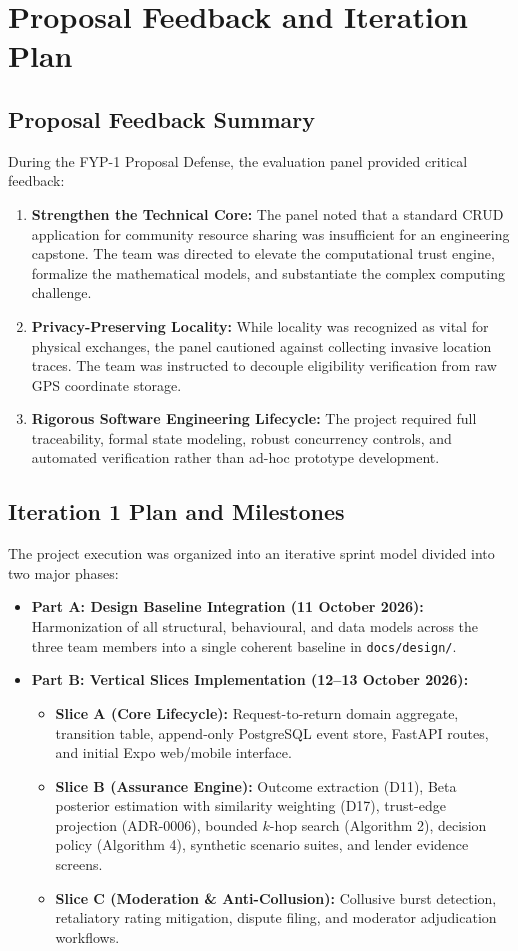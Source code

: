 \chapter{Proposal Feedback and Iteration Plan}

\section{Proposal Feedback Summary}
During the FYP-1 Proposal Defense, the evaluation panel provided critical feedback:
\begin{enumerate}
    \item \textbf{Strengthen the Technical Core:} The panel noted that a standard CRUD application for community resource sharing was insufficient for an engineering capstone. The team was directed to elevate the computational trust engine, formalize the mathematical models, and substantiate the complex computing challenge.
    \item \textbf{Privacy-Preserving Locality:} While locality was recognized as vital for physical exchanges, the panel cautioned against collecting invasive location traces. The team was instructed to decouple eligibility verification from raw GPS coordinate storage.
    \item \textbf{Rigorous Software Engineering Lifecycle:} The project required full traceability, formal state modeling, robust concurrency controls, and automated verification rather than ad-hoc prototype development.
\end{enumerate}

\section{Iteration 1 Plan and Milestones}
The project execution was organized into an iterative sprint model divided into two major phases:
\begin{itemize}
    \item \textbf{Part A: Design Baseline Integration (11 October 2026):} Harmonization of all structural, behavioural, and data models across the three team members into a single coherent baseline in \texttt{docs/design/}.
    \item \textbf{Part B: Vertical Slices Implementation (12--13 October 2026):}
    \begin{itemize}
        \item \textbf{Slice A (Core Lifecycle):} Request-to-return domain aggregate, transition table, append-only PostgreSQL event store, FastAPI routes, and initial Expo web/mobile interface.
        \item \textbf{Slice B (Assurance Engine):} Outcome extraction (D11), Beta posterior estimation with similarity weighting (D17), trust-edge projection (ADR-0006), bounded $k$-hop search (Algorithm 2), decision policy (Algorithm 4), synthetic scenario suites, and lender evidence screens.
        \item \textbf{Slice C (Moderation \& Anti-Collusion):} Collusive burst detection, retaliatory rating mitigation, dispute filing, and moderator adjudication workflows.
    \end{itemize}
\end{itemize}

